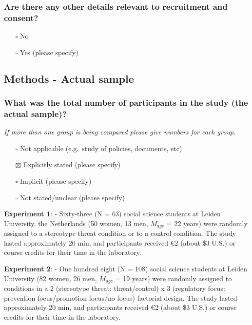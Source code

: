 \documentclass[
  doc, a4paper]{apa7}
\providecommand{\tightlist}{%
  \setlength{\itemsep}{0pt}\setlength{\parskip}{0pt}}
\begin{document}
\subsubsection{Are there any other details relevant to recruitment and consent?}\label{are-there-any-other-details-relevant-to-recruitment-and-consent}

\begin{itemize}
\tightlist
\item[$\square$]
  No
\item[$\square$]
  Yes (please specify)
\end{itemize}

\subsection{Methods - Actual sample}\label{methods---actual-sample}

\subsubsection{What was the total number of participants in the study (the actual sample)?}\label{what-was-the-total-number-of-participants-in-the-study-the-actual-sample}

\emph{If more than one group is being compared please give numbers for each group.}

\begin{itemize}
\tightlist
\item[$\square$]
  Not applicable (e.g.~study of policies, documents, etc)
\item[$\boxtimes$]
  Explicitly stated (please specify)
\item[$\square$]
  Implicit (please specify)
\item[$\square$]
  Not stated/unclear (please specify)
\end{itemize}

\textbf{Experiment 1}:
- Sixty-three (N = 63) social science students at Leiden University, the Netherlands (50 women, 13 men, \(M_{age}\) = 22 years) were randomly assigned to a stereotype threat condition or to a control condition. The study lasted approximately 20 min, and participants received €2 (about \$3 U.S.) or course credits for their time in the laboratory.

\textbf{Experiment 2}:
- One hundred eight (N = 108) social science students at Leiden University (82 women, 26 men, \(M_{age}\) = 19 years) were randomly assigned to conditions in a 2 (stereotype threat: threat/control) x 3 (regulatory focus: prevention focus/promotion focus/no focus) factorial design. The study lasted approximately 20 min, and participants received €2 (about \$3 U.S.) or course credits for their time in the laboratory.
\end{document}
